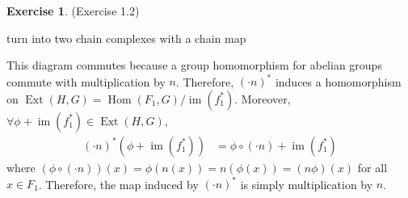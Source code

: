 \documentclass[12pt, psamsfonts]{amsart}
\theoremstyle{definition}
\newtheorem*{exer}{Exercise}
\theoremstyle{remark}
\DeclareMathOperator{\Hom}{Hom}
\DeclareMathOperator{\Ext}{Ext}
\DeclareMathOperator{\Hom}{Hom}
\DeclareMathOperator{\im}{im}
\numberwithin{equation}{section}
\begin{document}
\begin{exer}{(Exercise 1.2)}
  \begin{center}
  \end{center}
  turn into two chain complexes with a chain map
  \begin{center}
  \end{center}
  This diagram commutes because a group homomorphism for abelian groups commute with multiplication by $n$.
  Therefore, $(\cdot n)^{\ast}$ induces a homomorphism on $\Ext(H, G) = \Hom(F_1, G) / \im(f_1^{\ast})$.
  Moreover, $\forall \phi + \im(f_1^{\ast}) \in \Ext(H, G)$,
  \begin{align*}
    (\cdot n)^{\ast}(\phi + \im(f_1^{\ast}))
      &= \phi \circ (\cdot n) + \im(f_1^{\ast})
  \end{align*}
  where $(\phi \circ (\cdot n))(x) = \phi(n(x)) = n(\phi(x)) = (n\phi)(x)$ for all $x \in F_1$.
  Therefore, the map induced by $(\cdot n)^{\ast}$ is simply multiplication by $n$.
\end{exer}
\end{document}
